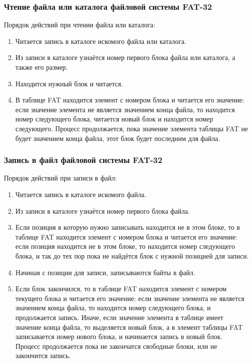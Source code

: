 \subsubsection{Чтение файла или каталога файловой системы FAT-32}

Порядок действий при чтении файла или каталога:

\begin{enumerate}
\item Читается запись в каталоге искомого файла или каталога.
\item Из записи в каталоге узнаётся номер первого блока файла или каталога, а также его размер.
\item Находится нужный блок и читается.
\item В таблице FAT находится элемент с номером блока и читается его значение: если значение элемента не является значением конца файла, то находится номер следующего блока, читается новый блок и находится номер следующего. Процесс продолжается, пока значение элемента таблицы FAT не будет значением конца файла, этот блок будет последним для файла.
\end{enumerate}

\subsubsection{Запись в файл файловой системы FAT-32}

Порядок действий при записи в файл:

\begin{enumerate}
\item Читается запись в каталоге искомого файла.
\item Из записи в каталоге узнаётся номер первого блока файла.
\item Если позиция в которую нужно записывать находится не в этом блоке, то в таблице FAT находится элемент с номером блока и читается его значение: если позиция находится не в этом блоке, то находится номер следующего блока, и так до тех пор пока не найдётся блок с нужной позицией для записи.
\item Начиная с позиции для записи, записываются байты в файл.
\item Если блок закончился, то в таблице FAT находится элемент с номером текущего блока и читается его значение: если значение элемента не является значением конца файла, то находится номер следующего блока, и продолжается запись. Иначе, если значение элемента в таблице имеет значение конца файла, то выделяется новый блок, а в элемент таблицы FAT записывается номер нового блока, и начинается запись в новый блок. Процесс продолжается пока не закончатся свободные блоки, или не закончится запись.
\end{enumerate}


